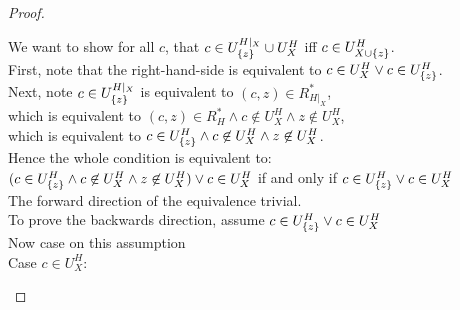 \begin{proof}
\begin{tabbedproof}
\oo We want to show for all $c$, that $c \in U^{H|_X}_{\{{z}\}} \cup U^H_X$ iff $c \in U^H_{X \cup \{{z}\}}$. \\
\oo First, note that the right-hand-side is equivalent to $c \in U^H_X \vee c \in U^H_{\{{z}\}}$. \\
\oo Next, note $c \in U^{H|_{X}}_{\{{z}\}}$ is equivalent to $(c,z) \in R^*_{H|_{X}}$, \\
\ooo which is equivalent to  $(c, z) \in R^*_H \land c \not\in U^H_{X} \land z \not\in U^H_{X}$, \\
\ooo  which is equivalent to  $c \in U^H_{\{{z}\}} \land c \not\in U^H_{X} \land z \not\in U^H_{X}$. \\
\oo Hence the whole condition is equivalent to:\\
\oox $(c \in U^H_{\{{z}\}} \land c \not\in U^H_{X} \land z \not\in U^H_{X}) \vee c \in U^H_{X}$ if and only if 
    $c \in U^H_{\{{z}\}} \vee c \in U^H_{X}$ \\
\oo The forward direction of the equivalence trivial. \\
\oo To prove the backwards direction, assume $c \in U^H_{\{{z}\}} \vee c \in U^H_{X}$ \\
\ooo Now case on this assumption \\
\ooo Case $c \in U^H_{X}$: \\

\end{tabbedproof}
\end{proof}
